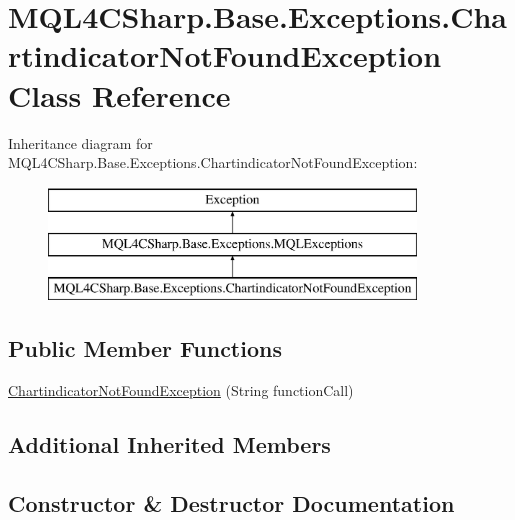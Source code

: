 \hypertarget{class_m_q_l4_c_sharp_1_1_base_1_1_exceptions_1_1_chartindicator_not_found_exception}{}\section{M\+Q\+L4\+C\+Sharp.\+Base.\+Exceptions.\+Chartindicator\+Not\+Found\+Exception Class Reference}
\label{class_m_q_l4_c_sharp_1_1_base_1_1_exceptions_1_1_chartindicator_not_found_exception}
Inheritance diagram for M\+Q\+L4\+C\+Sharp.\+Base.\+Exceptions.\+Chartindicator\+Not\+Found\+Exception\+:\begin{figure}[H]
\begin{center}
\leavevmode
\includegraphics[height=3.000000cm]{class_m_q_l4_c_sharp_1_1_base_1_1_exceptions_1_1_chartindicator_not_found_exception}
\end{center}
\end{figure}
\subsection*{Public Member Functions}
\begin{DoxyCompactItemize}
\item 
\hyperlink{class_m_q_l4_c_sharp_1_1_base_1_1_exceptions_1_1_chartindicator_not_found_exception_a34ccc07df61f37cd8110e641059476d9}{Chartindicator\+Not\+Found\+Exception} (String function\+Call)
\end{DoxyCompactItemize}
\subsection*{Additional Inherited Members}


\subsection{Constructor \& Destructor Documentation}
